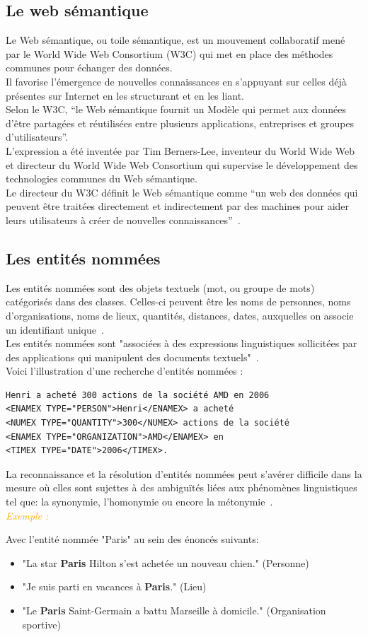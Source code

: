 \documentclass[a4paper, 11pt]{report}
\newenvironment{exemple}
    {
    \textit{\textcolor{orange}{
    Exemple : \\}}
    }
    {~\\
    }
\begin{document}
\subsection{Le web sémantique}
Le Web sémantique, ou toile sémantique, est un mouvement collaboratif mené par le World Wide Web Consortium (W3C) qui met en place des méthodes communes pour échanger des données.\\
Il favorise l'émergence de nouvelles connaissances en s'appuyant sur celles déjà présentes sur Internet en les structurant et en les liant.\\
Selon le W3C, ``le Web sémantique fournit un Modèle qui permet aux données d'être partagées et réutilisées entre plusieurs applications, entreprises et groupes d'utilisateurs''.\\
L'expression a été inventée par Tim Berners-Lee, inventeur du World Wide Web et directeur du World Wide Web Consortium qui supervise le développement des technologies communes du Web sémantique. \\
Le directeur du W3C définit le Web sémantique comme ``un web des données qui peuvent être traitées directement et indirectement par des machines pour aider leurs utilisateurs à créer de nouvelles connaissances''~\cite{w1ws}.

\subsection{Les entités nommées}
Les entités nommées sont des objets textuels (mot, ou groupe de mots) catégorisés dans des classes. Celles-ci peuvent être les noms de personnes, noms d'organisations, noms de lieux, quantités, distances, dates, auxquelles on associe un identifiant unique~\cite{w2re}.\\
Les entités nommées sont "associées à des expressions linguistiques sollicitées par des applications qui manipulent des documents textuels"~\cite{DN12}.\\
Voici l'illustration d'une recherche d'entités nommées :
\begin{verbatim}
Henri a acheté 300 actions de la société AMD en 2006
<ENAMEX TYPE="PERSON">Henri</ENAMEX> a acheté 
<NUMEX TYPE="QUANTITY">300</NUMEX> actions de la société 
<ENAMEX TYPE="ORGANIZATION">AMD</ENAMEX> en 
<TIMEX TYPE="DATE">2006</TIMEX>.
\end{verbatim}
La reconnaissance et la résolution d'entités nommées peut s'avérer difficile dans la mesure où elles sont sujettes à des ambiguïtés liées aux phénomènes linguistiques tel que: la synonymie, l'homonymie ou encore la métonymie~\cite{DN12}.\\
\begin{exemple}
Avec l’entité nommée "Paris" au sein des énoncés suivants:
\begin{itemize}
\item "La star \textbf{Paris} Hilton s'est achetée un nouveau chien." (Personne)
\item "Je suis parti en vacances à \textbf{Paris}." (Lieu)
\item "Le \textbf{Paris} Saint-Germain a battu Marseille à domicile." (Organisation sportive)
\end{itemize}
\end{exemple}
\end{document}
